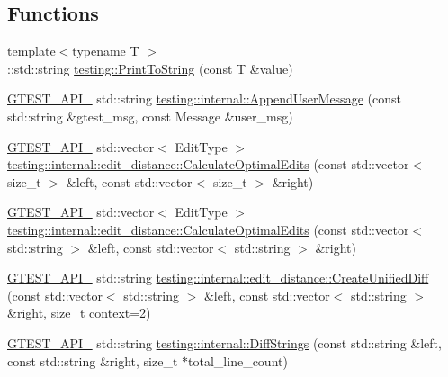 \subsection*{Functions}
\begin{DoxyCompactItemize}
\item 
{\footnotesize template$<$typename T $>$ }\\\+::std\+::string \hyperlink{namespacetesting_aa5717bb1144edd1d262d310ba70c82ed}{testing\+::\+Print\+To\+String} (const T \&value)
\item 
\hyperlink{gtest-port_8h_aa73be6f0ba4a7456180a94904ce17790}{G\+T\+E\+S\+T\+\_\+\+A\+P\+I\+\_\+} std\+::string \hyperlink{namespacetesting_1_1internal_af69e146a989e8d48def39a0cc59461c9}{testing\+::internal\+::\+Append\+User\+Message} (const std\+::string \&gtest\+\_\+msg, const Message \&user\+\_\+msg)
\item 
\hyperlink{gtest-port_8h_aa73be6f0ba4a7456180a94904ce17790}{G\+T\+E\+S\+T\+\_\+\+A\+P\+I\+\_\+} std\+::vector$<$ Edit\+Type $>$ \hyperlink{namespacetesting_1_1internal_1_1edit__distance_ad28f23b77f716200bc6644bfc7413a63}{testing\+::internal\+::edit\+\_\+distance\+::\+Calculate\+Optimal\+Edits} (const std\+::vector$<$ size\+\_\+t $>$ \&left, const std\+::vector$<$ size\+\_\+t $>$ \&right)
\item 
\hyperlink{gtest-port_8h_aa73be6f0ba4a7456180a94904ce17790}{G\+T\+E\+S\+T\+\_\+\+A\+P\+I\+\_\+} std\+::vector$<$ Edit\+Type $>$ \hyperlink{namespacetesting_1_1internal_1_1edit__distance_ad2258c5c811f8f262335f58641b33544}{testing\+::internal\+::edit\+\_\+distance\+::\+Calculate\+Optimal\+Edits} (const std\+::vector$<$ std\+::string $>$ \&left, const std\+::vector$<$ std\+::string $>$ \&right)
\item 
\hyperlink{gtest-port_8h_aa73be6f0ba4a7456180a94904ce17790}{G\+T\+E\+S\+T\+\_\+\+A\+P\+I\+\_\+} std\+::string \hyperlink{namespacetesting_1_1internal_1_1edit__distance_a48cffebc6d3169ad1df7849b5f7fb5ff}{testing\+::internal\+::edit\+\_\+distance\+::\+Create\+Unified\+Diff} (const std\+::vector$<$ std\+::string $>$ \&left, const std\+::vector$<$ std\+::string $>$ \&right, size\+\_\+t context=2)
\item 
\hyperlink{gtest-port_8h_aa73be6f0ba4a7456180a94904ce17790}{G\+T\+E\+S\+T\+\_\+\+A\+P\+I\+\_\+} std\+::string \hyperlink{namespacetesting_1_1internal_a513107ff8defa97d949937fc1350a56c}{testing\+::internal\+::\+Diff\+Strings} (const std\+::string \&left, const std\+::string \&right, size\+\_\+t $\ast$total\+\_\+line\+\_\+count)
\item 

\end{DoxyCompactItemize}

